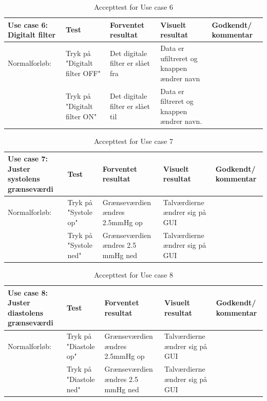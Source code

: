 \begin{table}[h!]
\caption{Accepttest for Use case 6}\label{tab:tabel8}
\begin{tabular}{|>{\raggedright\arraybackslash}p{2.5cm}| >{\raggedright\arraybackslash}p{2.9cm} | >{\raggedright\arraybackslash}p{2.9cm} | >{\raggedright\arraybackslash}p{2.9cm} | >{\raggedright\arraybackslash}p{2.8cm} |}
   \hline
   \textbf{Use case 6: Digitalt filter } &\textbf{Test}& \textbf{Forventet resultat} & \textbf{Visuelt resultat} & \textbf{Godkendt/ kommentar}\\ \hline
   Normalforløb:& Tryk på "Digitalt filter OFF" & Det digitale filter er slået fra & Data er ufiltreret og knappen ændrer navn &\\\hline
   &Tryk på "Digitalt filter ON" &Det digitale filter er slået til &Data er filtreret og knappen ændrer navn. &\\\hline
\end{tabular}
\end{table}


\begin{table}[h!]
\caption{Accepttest for Use case 7}\label{tab:tabel8}
\begin{tabular}{|>{\raggedright\arraybackslash}p{2.5cm}| >{\raggedright\arraybackslash}p{2.9cm} | >{\raggedright\arraybackslash}p{2.9cm} | >{\raggedright\arraybackslash}p{2.9cm} | >{\raggedright\arraybackslash}p{2.8cm} |}
   \hline
   \textbf{Use case 7: Juster systolens grænseværdi } &\textbf{Test}& \textbf{Forventet resultat} & \textbf{Visuelt resultat} & \textbf{Godkendt/ kommentar}\\ \hline
   Normalforløb:& Tryk på "Systole op"& Grænseværdien ændres 2.5mmHg op & Talværdierne ændrer sig på GUI &\\\hline
   &Tryk på "Systole ned" & Grænseværdien ændres 2.5 mmHg ned & Talværdierne ændrer sig på GUI & \\\hline
\end{tabular}
\end{table}


\begin{table}[h!]
\caption{Accepttest for Use case 8}\label{tab:tabel8}
\begin{tabular}{|>{\raggedright\arraybackslash}p{2.5cm}| >{\raggedright\arraybackslash}p{2.9cm} | >{\raggedright\arraybackslash}p{2.9cm} | >{\raggedright\arraybackslash}p{2.9cm} | >{\raggedright\arraybackslash}p{2.8cm} |}
   \hline
   \textbf{Use case 8: Juster diastolens grænseværdi } &\textbf{Test}& \textbf{Forventet resultat} & \textbf{Visuelt resultat} & \textbf{Godkendt/ kommentar}\\ \hline
   Normalforløb:&Tryk på "Diastole op"  & Grænseværdien ændres 2.5mmHg op & Talværdierne ændrer sig på GUI &\\\hline
   &Tryk på "Diastole ned" & Grænseværdien ændres 2.5 mmHg ned & Talværdierne ændrer sig på GUI &\\\hline
\end{tabular}
\end{table}


